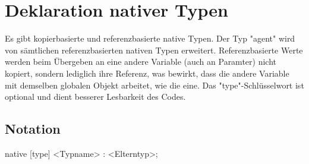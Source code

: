 \chapter { Deklaration nativer Typen }

Es gibt kopierbasierte und referenzbasierte native Typen. Der Typ "agent" wird von sämtlichen referenzbasierten nativen Typen erweitert.
Referenzbasierte Werte werden beim Übergeben an eine andere Variable (auch an Paramter) nicht kopiert, sondern lediglich ihre Referenz,
was bewirkt, dass die andere Variable mit demselben globalen Objekt arbeitet, wie die eine.
Das "type"-Schlüsselwort ist optional und dient besserer Lesbarkeit des Codes.

\section { Notation }
native [type] <Typname> : <Elterntyp>;